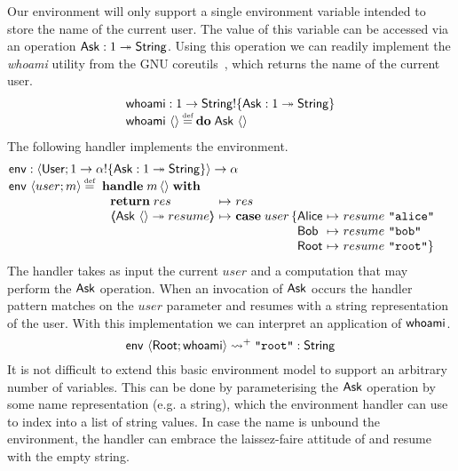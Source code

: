 \documentclass[12pt,phd,lfcs,twoside,openright,logo,leftchapter,normalheadings]{infthesis}
\theoremstyle{plain}
\theoremstyle{definition}
\begin{document}
Our environment will only support a single environment variable
intended to store the name of the current user. The value of this
variable can be accessed via an operation $\mathsf{Ask} : 1 \twoheadrightarrow \mathsf{String}$.
%
%
Using this operation we can readily implement the \emph{whoami}
utility from the GNU coreutils~\cite[Section~20.3]{MacKenzieMPPBYS20},
which returns the name of the current user.
%
\[
  \bl
    \whoami : \UnitType \to \String \eff \{\Ask : \UnitType \opto \String\}\\
    \whoami~\Unit \defas \Do\;\Ask~\Unit
  \el
\]
%
The following handler implements the environment.
%
\[
  \bl
    \environment : \Record{\User;\UnitType \to \alpha \eff \{\Ask : \UnitType \opto \String\}} \to \alpha\\
    \environment~\Record{user;m} \defas
       \ba[t]{@{~}l}
         \Handle\;m\,\Unit\;\With\\
           ~\ba{@{~}l@{~}c@{~}l}
              \Return\;res &\mapsto& res\\
              \OpCase{\Ask}{\Unit}{resume} &\mapsto&
                \bl
                  \Case\;user\,\{
                  \ba[t]{@{}l@{~}c@{~}l}
                    \Alice &\mapsto& resume~\strlit{alice}\\
                    \Bob   &\mapsto& resume~\strlit{bob}\\
                    \Root  &\mapsto& resume~\strlit{root}\}
                   \ea
                \el
           \ea
       \ea
  \el
\]
%
The handler takes as input the current $user$ and a computation that
may perform the $\mathsf{Ask}$ operation. When an invocation of $\mathsf{Ask}$ occurs
the handler pattern matches on the $user$ parameter and resumes with a
string representation of the user. With this implementation we can
interpret an application of $\mathsf{whoami}$.
%
\[
  \mathsf{env}~\langle \mathsf{Root};\mathsf{whoami} \rangle \leadsto^+ \texttt{"root"} : \mathsf{String}
\]
%
It is not difficult to extend this basic environment model to support
an arbitrary number of variables. This can be done by parameterising
the $\mathsf{Ask}$ operation by some name representation (e.g. a string),
which the environment handler can use to index into a list of string
values. In case the name is unbound the environment, the handler can
embrace the laissez-faire attitude of \UNIX{} and resume with the
empty string.
\end{document}
